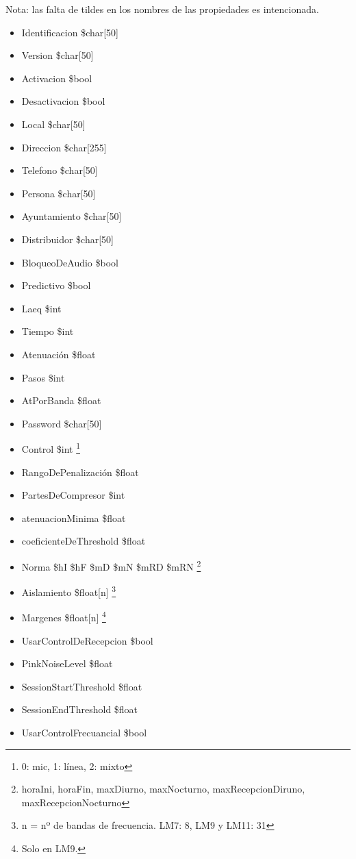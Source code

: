 Nota: las falta de tildes en los nombres de las propiedades es intencionada.
\begin{itemize}
	\item Identificacion \$char[50]
	\item Version \$char[50]
	\item Activacion \$bool
	\item Desactivacion \$bool
	\item Local \$char[50]
	\item Direccion \$char[255]
	\item Telefono \$char[50]
	\item Persona \$char[50]
	\item Ayuntamiento \$char[50]
	\item Distribuidor \$char[50]
	\item BloqueoDeAudio \$bool
	\item Predictivo \$bool
	\item Laeq \$int
	\item Tiempo \$int
	\item Atenuación \$float
	\item Pasos \$int
	\item AtPorBanda \$float
	\item Password \$char[50]
	\item Control \$int \footnote{0: mic, 1: línea, 2: mixto}
	\item RangoDePenalización \$float
	\item PartesDeCompresor \$int
	\item atenuacionMinima  \$float
	\item coeficienteDeThreshold \$float
	\item Norma \$hI \$hF \$mD \$mN \$mRD \$mRN \footnote{horaIni, horaFin, maxDiurno, maxNocturno, maxRecepcionDiruno, maxRecepcionNocturno}
	\item Aislamiento \$float[n] \footnote{n = nº de bandas de frecuencia. LM7: 8, LM9 y LM11: 31} 
	\item Margenes \$float[n] \footnote{Solo en LM9.} 
	\item UsarControlDeRecepcion \$bool
	\item PinkNoiseLevel \$float
	\item SessionStartThreshold \$float
	\item SessionEndThreshold \$float
	\item UsarControlFrecuancial \$bool

\end{itemize}
